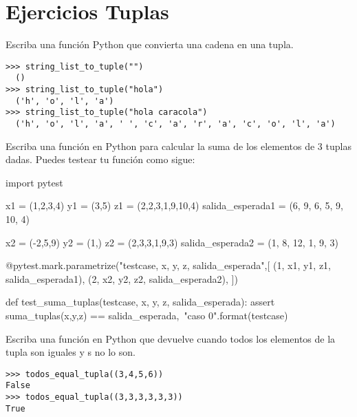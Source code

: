 \section{Ejercicios Tuplas}\label{ejercicios}

\begin{exercise}
Escriba una función  Python que convierta una cadena en una tupla.

\begin{Verbatim}[frame=single, label = {\em example test runs}]
>>> string_list_to_tuple("")
  ()
>>> string_list_to_tuple("hola")
  ('h', 'o', 'l', 'a')
>>> string_list_to_tuple("hola caracola")
  ('h', 'o', 'l', 'a', ' ', 'c', 'a', 'r', 'a', 'c', 'o', 'l', 'a')
\end{Verbatim}

\end{exercise}

\begin{exercise}
Escriba una función  en Python para calcular la suma de los elementos de 3 tuplas dadas. Puedes testear tu función como sigue:

\begin{python}
import pytest

x1 = (1,2,3,4)
y1 = (3,5)
z1 = (2,2,3,1,9,10,4)
salida_esperada1 = (6, 9, 6, 5, 9, 10, 4)

x2 = (-2,5,9)
y2 = (1,)
z2 = (2,3,3,1,9,3)
salida_esperada2 = (1, 8, 12, 1, 9, 3)

@pytest.mark.parametrize("testcase, x, y, z, salida_esperada",[
(1, x1, y1, z1, salida_esperada1),
(2, x2, y2, z2, salida_esperada2),
]) 

def test_suma_tuplas(testcase, x, y, z, salida_esperada):
    assert suma_tuplas(x,y,z) == salida_esperada,\
           "caso {0}".format(testcase)
\end{python}
\end{exercise}



\begin{exercise}
Escriba una función  en Python que devuelve  cuando todos los elementos de la tupla son iguales y  s no lo son.

\begin{Verbatim}[frame=single, label = {\em example test runs}]
>>> todos_equal_tupla((3,4,5,6))
False
>>> todos_equal_tupla((3,3,3,3,3,3))
True
\end{Verbatim}

\end{exercise}


